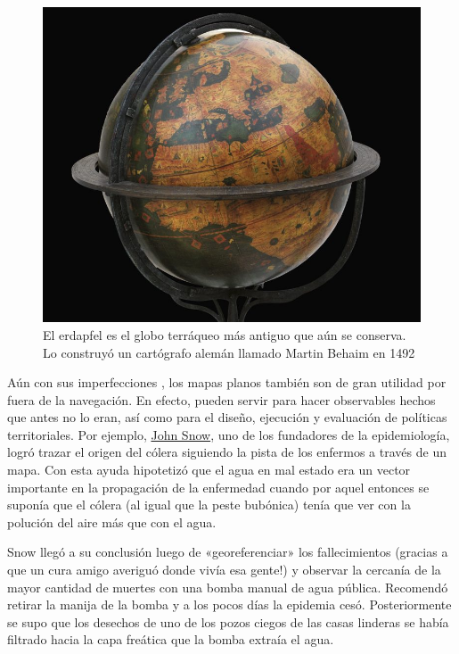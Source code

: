 \documentclass[
  letterpaper,
  DIV=11,
  numbers=noendperiod]{scrreprt}
\begin{document}
\begin{tcolorbox}
\begin{figure}[H]
{\centering \includegraphics{./Inputs/Images/erdapfel-1492-768x640.jpg}

}

\caption{El erdapfel es el globo terráqueo más antiguo que aún se
conserva. Lo construyó un cartógrafo alemán llamado Martin Behaim en
1492}

\end{figure}

Aún con sus imperfecciones , los mapas planos también son de gran
utilidad por fuera de la navegación. En efecto, pueden servir para hacer
observables hechos que antes no lo eran, así como para el diseño,
ejecución y evaluación de políticas territoriales. Por ejemplo,
\href{https://es.wikipedia.org/wiki/John_Snow}{John Snow}, uno de los
fundadores de la epidemiología, logró trazar el origen del cólera
siguiendo la pista de los enfermos a través de un mapa. Con esta ayuda
hipotetizó que el agua en mal estado era un vector importante en la
propagación de la enfermedad cuando por aquel entonces se suponía que el
cólera (al igual que la peste bubónica) tenía que ver con la polución
del aire más que con el agua.

Snow llegó a su conclusión luego de «georeferenciar» los fallecimientos
(gracias a que un cura amigo averiguó donde vivía esa gente!) y observar
la cercanía de la mayor cantidad de muertes con una bomba manual de agua
pública. Recomendó retirar la manija de la bomba y a los pocos días la
epidemia cesó. Posteriormente se supo que los desechos de uno de los
pozos ciegos de las casas linderas se había filtrado hacia la capa
freática que la bomba extraía el agua.


\end{tcolorbox}
\end{document}
